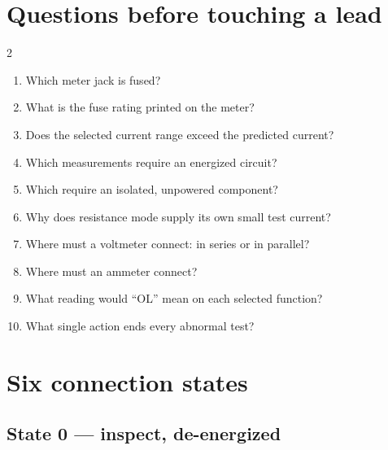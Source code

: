 \section{Questions before touching a lead}

\begin{multicols}{2}
\begin{enumerate}
\item Which meter jack is fused?
\item What is the fuse rating printed on the meter?
\item Does the selected current range exceed the predicted current?
\item Which measurements require an energized circuit?
\item Which require an isolated, unpowered component?
\item Why does resistance mode supply its own small test current?
\item Where must a voltmeter connect: in series or in parallel?
\item Where must an ammeter connect?
\item What reading would ``OL'' mean on each selected function?
\item What single action ends every abnormal test?
\end{enumerate}
\end{multicols}

\section{Six connection states}

\subsection{State 0 --- inspect, de-energized}

\begin{center}
\end{center}

